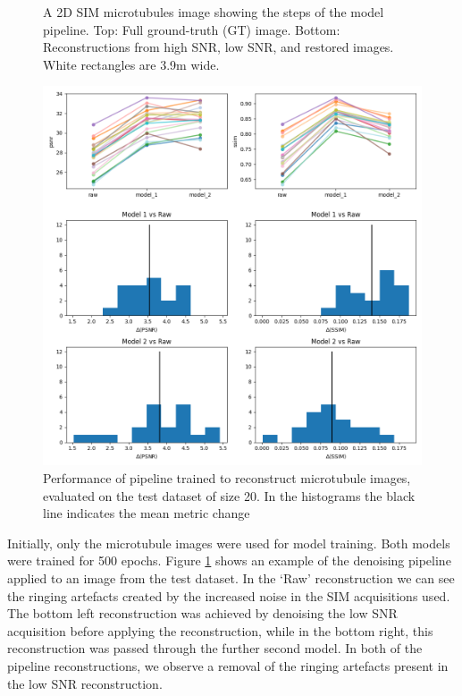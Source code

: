 \documentclass[12pt]{article}
\begin{document}
\begin{figure}[hbtp]
    \caption{A 2D SIM microtubules image showing the steps of the model pipeline.
    Top: Full ground-truth (GT) image. Bottom: Reconstructions from high SNR, low SNR, and restored images. White rectangles are 3.9\textmu m wide.}
    \label{fig:microtub_samples}
\end{figure}

\begin{figure}[hbtp]
    \includegraphics[scale=0.7, center]{figures/m019_m020_pipeline_stats.png}
    \caption{Performance of pipeline trained to reconstruct microtubule images, evaluated on the test dataset of size 20.
    In the histograms the black line indicates the mean metric change}
    \label{fig:m019_m020_pipeline_stats}
\end{figure}

Initially, only the microtubule images were used for model training.
Both models were trained for 500 epochs.
Figure \ref{fig:microtub_samples} shows an example of the denoising pipeline applied to an image from the test dataset.
In the `Raw' reconstruction we can see the ringing artefacts created by the increased noise in the SIM acquisitions used.
The bottom left reconstruction was achieved by denoising the low SNR acquisition before applying the reconstruction,
while in the bottom right, this reconstruction was passed through the further second model.
In both of the pipeline reconstructions, we observe a removal of the ringing artefacts present in the low SNR reconstruction.
\end{document}
